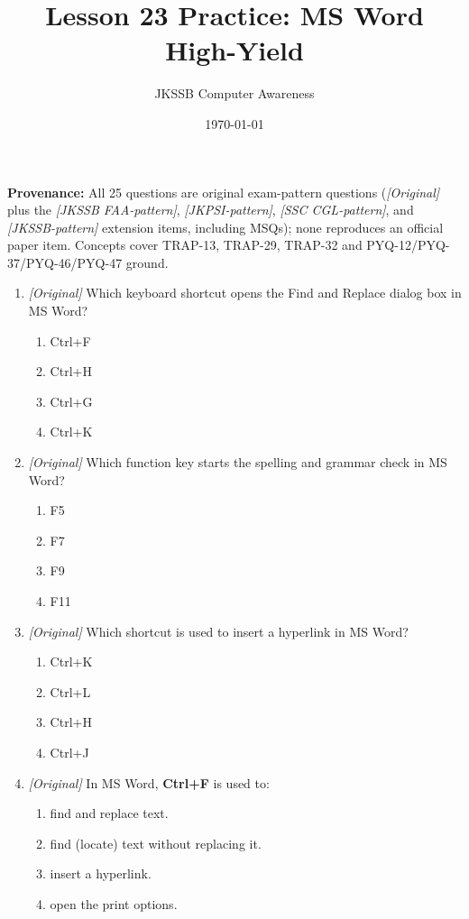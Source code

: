 \documentclass[11pt]{article}
\title{Lesson 23 Practice: MS Word High-Yield}
\author{JKSSB Computer Awareness}
\date{\today}
\begin{document}
\maketitle
\noindent\textbf{Provenance:} All 25 questions are original exam-pattern questions (\textit{[Original]} plus the \textit{[JKSSB FAA-pattern]}, \textit{[JKPSI-pattern]}, \textit{[SSC CGL-pattern]}, and \textit{[JKSSB-pattern]} extension items, including MSQs); none reproduces an official paper item.
Concepts cover TRAP-13, TRAP-29, TRAP-32 and PYQ-12/PYQ-37/PYQ-46/PYQ-47 ground.

\begin{enumerate}[label=\textbf{Q\arabic*.}, leftmargin=*]
\item \textit{[Original]} Which keyboard shortcut opens the Find and Replace
  dialog box in MS Word?
  \begin{enumerate}[label=\Alph*.]
    \item Ctrl+F
    \item Ctrl+H
    \item Ctrl+G
    \item Ctrl+K
  \end{enumerate}
\item \textit{[Original]} Which function key starts the spelling and grammar
  check in MS Word?
  \begin{enumerate}[label=\Alph*.]
    \item F5
    \item F7
    \item F9
    \item F11
  \end{enumerate}
\item \textit{[Original]} Which shortcut is used to insert a hyperlink in
  MS Word?
  \begin{enumerate}[label=\Alph*.]
    \item Ctrl+K
    \item Ctrl+L
    \item Ctrl+H
    \item Ctrl+J
  \end{enumerate}
\item \textit{[Original]} In MS Word, \textbf{Ctrl+F} is used to:
  \begin{enumerate}[label=\Alph*.]
    \item find and replace text.
    \item find (locate) text without replacing it.
    \item insert a hyperlink.
    \item open the print options.

\end{enumerate}
\end{enumerate}
\end{document}
